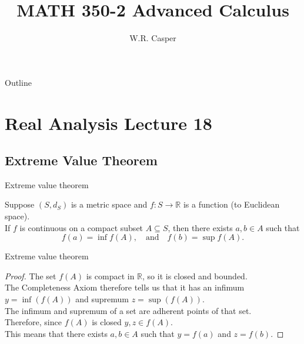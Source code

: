 \documentclass{beamer}
\title{MATH 350-2 Advanced Calculus}
\subtitle
{} %
\author[W.R. Casper] %
{W.R. Casper}
\institute[California State University Fullerton] %
{
  Department of Mathematics\\
  California State University Fullerton}
\begin{document}
\begin{frame}
  \titlepage
\end{frame}

\begin{frame}{Outline}
  \tableofcontents
\end{frame}



\section{Real Analysis Lecture 18}

\subsection{Extreme Value Theorem}

\begin{frame}{Extreme value theorem}
\begin{thm}
Suppose $(S,d_S)$ is a metric space and $f: S\rightarrow \mathbb{R}$ is a function (to Euclidean space).\\
If $f$ is continuous on a compact subset $A\subseteq S$, then there exists $a,b\in A$ such that
$$f(a) = \inf f(A),\quad\text{and}\quad f(b) = \sup f(A).$$
\end{thm}
\end{frame}

\begin{frame}{Extreme value theorem}
\pause
\begin{proof}
\pause
The set $f(A)$ is compact in $\mathbb{R}$, so it is closed and bounded.\\
\pause
The Completeness Axiom therefore tells us that it has an infimum $y=\inf(f(A))$ and supremum $z=\sup(f(A))$.\\
\pause
The infimum and supremum of a set are adherent points of that set.\\
\pause
Therefore, since $f(A)$ is closed $y,z\in f(A)$.\\
\pause
This means that there exists $a,b\in A$ such that $y=f(a)$ and $z=f(b)$.
\end{proof}
\end{frame}
\end{document}
